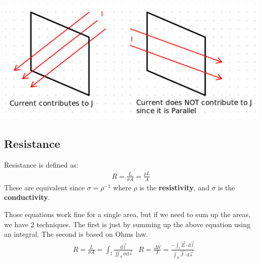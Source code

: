 \documentclass[12pt,letterpaper]{article} \usepackage{amsmath} \usepackage{graphicx} \usepackage[margin=1in]{geometry} \usepackage{longtable}  \usepackage{amssymb}
\begin{document}
	\begin{center}
		\includegraphics[width=0.7\linewidth]{../MAT2377/current-density-contirbutions}
	\end{center}


	\subsection{Resistance}
	Resistance is defined as:
	\begin{align*}
		R = \frac{L}{\sigma A} = \frac{\rho L}{A}
	\end{align*}
	These are equivalent since $\sigma = \rho^{-1}$ where $\rho$ is the \textbf{resistivity}, and $\sigma$ is the \textbf{conductivity}.
	
	Those equations work fine for a single area, but if we need to sum up the areas, we have 2 techniques. The first is just by summing up the above equation using an integral. The second is based on Ohms law. 
	\begin{align*}
		 &R = \frac{L}{\sigma A} = \int_l \frac{\mathrm d \vec l}{\iint_S \sigma \mathrm d \vec s} &R = \frac{\Delta V}{I} = \frac{-\int_l \vec E \cdot \mathrm d \vec l}{\int_S \vec J \cdot \mathrm d \vec s} 
	\end{align*}
\end{document}
